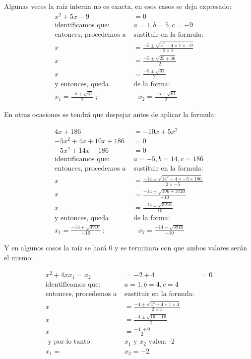     Algunas veces la raíz interna no es exacta, en esos casos se deja expresado:
    \begin{align*}
        x^2 + 5x -9 &= 0		\\
        \text{identificamos que: }& a=1,b=5,c=-9\\
        \text{entonces, procedemos a }&\text{sustituir en la formula:}\\
        x &= \frac{-5\pm \sqrt{5^2-4\times1\times-9}}{2\times1}\\
        x &= \frac{-5\pm \sqrt{25+36}}{2}\\
        x &= \frac{-5\pm \sqrt{61}}{2}\\
        \text{y entonces, queda }&\text{de la forma:}\\
        x_1 = \frac{-5 +\sqrt{61}}{2}\ ;&\ \ \  x_2 = \frac{-5 -\sqrt{61}}{2}
    \end{align*}

    En otras ocasiones se tendrá que despejar antes de aplicar la formula:

    \begin{align*}
        4x +186 &= -10x + 5x^2 \\
        -5x^2 +4x+10x+186 &= 0\\
        -5x^2 +14x+186 &= 0\\
        \text{identificamos que: }& a=-5,b=14,c=186\\
        \text{entonces, procedemos a }&\text{sustituir en la formula:}\\
        x &= \frac{-14\pm \sqrt{14^2-4\times-5\times186}}{2\times-5}\\
        x &= \frac{-14 \pm \sqrt{196+3720}}{-10}\\
        x &= \frac{-14 \pm \sqrt{3916}}{-10} \\
        \text{y entonces, queda }&\text{de la forma:}\\
        x_1 = \frac{-14+\sqrt{3916}}{-10}\ ;&\ \ \  x_2 = \frac{-14 -\sqrt{3916}}{-10}
    \end{align*}

    Y en algunos casos la raíz se hará 0 y se terminara con que ambos valores
    serán el mismo:

    \begin{align*}
        x^2 +4x x_1=x_2&=-2+4 &= 0		\\
        \text{identificamos que: }& a=1,b=4,c=4\\
        \text{entonces, procedemos a }&\text{sustituir en la formula:}\\
        x &= \frac{-4\pm \sqrt{4^2-4\times1\times4}}{2\times1}\\
        x &= \frac{-4 \pm \sqrt{ 16 - 16}}{2} \\
        x &= \frac{-4\ \pm 0}{2}\\
        \text{ y por lo tanto }&\text{$x_1$ y $x_2$ valen: -2}\\
        x_1=&x_2=-2
    \end{align*}




